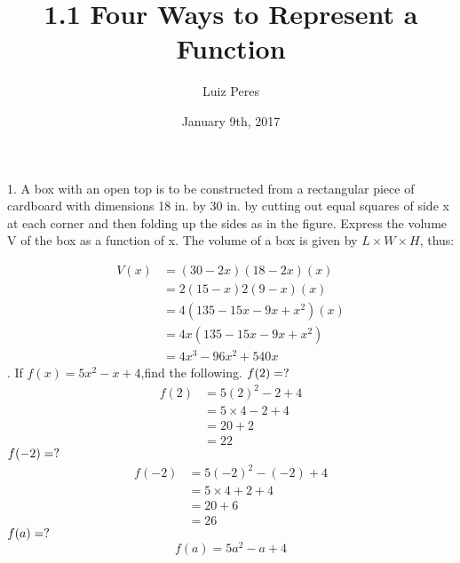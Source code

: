 \documentclass{article}
\title{1.1 Four Ways to Represent a Function}
\author{Luiz Peres}
\date{January 9th, 2017}
\begin{document}
\maketitle

1. A box with an open top is to be constructed from a rectangular piece of cardboard with dimensions 18 in. by 30 in. by cutting out equal squares of side x at each corner and then folding up the sides as in the figure. Express the volume V of the box as a function of x.
\newline\newline
The volume of a box is given by $L \times W \times H$, thus:

\begin{equation}
\begin{split}
    V(x) & = (30 - 2x)(18 - 2x) (x) \\
    & = 2(15 - x) 2(9 - x) (x) \\ 
    & = 4(135 - 15x - 9x + x^2) (x) \\
    & = 4x(135 - 15x - 9x + x^2) \\
    & = 4x^3 -96x^2 + 540x 
\end{split}
\end{equation}
\newline{}. If $f(x) = 5x^2 - x + 4$,find the following.
\newline\newline$f(2) = \space ?$
\begin{equation}
\begin{split}
    f(2) & = 5(2)^2 - 2 + 4 \\
    & = 5 \times 4 - 2 + 4 \\
    & = 20 + 2 \\
    & = 22
\end{split}
\end{equation}
\newline\newline
$f(-2) = \space ?$
\begin{equation}
\begin{split}
    f(-2) & = 5(-2)^2 - (-2) + 4 \\
    & = 5 \times 4 + 2 + 4 \\
    & = 20 + 6 \\
    & = 26
\end{split}
\end{equation}
\newline\newline
$f(a) = \space ?$
\begin{equation}
    f(a)  = 5a^2 - a + 4
\end{equation}
\end{document}
